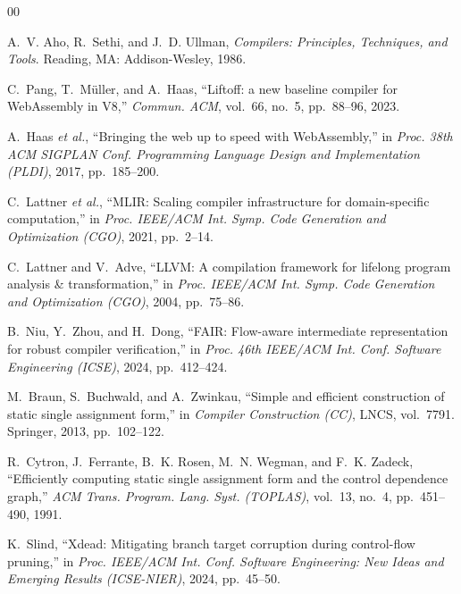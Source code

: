 \documentclass[conference]{IEEEtran}
\begin{document}
\begin{thebibliography}{00}
\footnotesize
\setlength{\itemsep}{0.2pt plus 0.2pt minus 0.1pt}
\setlength{\parskip}{0pt}

A.~V. Aho, R.~Sethi, and J.~D. Ullman,
\textit{Compilers: Principles, Techniques, and Tools}.
\newblock Reading, MA: Addison-Wesley, 1986.

C.~Pang, T.~M\"uller, and A.~Haas,
``Liftoff: a new baseline compiler for WebAssembly in V8,''
\textit{Commun. ACM}, vol.~66, no.~5, pp.~88--96, 2023.

A.~Haas \textit{et al.},
``Bringing the web up to speed with WebAssembly,''
in \textit{Proc. 38th ACM SIGPLAN Conf. Programming Language Design and Implementation (PLDI)},
2017, pp.~185--200.

C.~Lattner \textit{et al.},
``MLIR: Scaling compiler infrastructure for domain-specific computation,''
in \textit{Proc. IEEE/ACM Int. Symp. Code Generation and Optimization (CGO)},
2021, pp.~2--14.

C.~Lattner and V.~Adve,
``LLVM: A compilation framework for lifelong program analysis \& transformation,''
in \textit{Proc. IEEE/ACM Int. Symp. Code Generation and Optimization (CGO)},
2004, pp.~75--86.

B.~Niu, Y.~Zhou, and H.~Dong,
``FAIR: Flow-aware intermediate representation for robust compiler verification,''
in \textit{Proc. 46th IEEE/ACM Int. Conf. Software Engineering (ICSE)},
2024, pp.~412--424.

M.~Braun, S.~Buchwald, and A.~Zwinkau,
``Simple and efficient construction of static single assignment form,''
in \textit{Compiler Construction (CC)}, LNCS, vol.~7791.
\newblock Springer, 2013, pp.~102--122.

R.~Cytron, J.~Ferrante, B.~K. Rosen, M.~N. Wegman, and F.~K. Zadeck,
``Efficiently computing static single assignment form and the control dependence graph,''
\textit{ACM Trans. Program. Lang. Syst. (TOPLAS)}, vol.~13, no.~4, pp.~451--490, 1991.

K.~Slind,
``Xdead: Mitigating branch target corruption during control-flow pruning,''
in \textit{Proc. IEEE/ACM Int. Conf. Software Engineering: New Ideas and Emerging Results (ICSE-NIER)},
2024, pp.~45--50.


\end{thebibliography}
\end{document}

